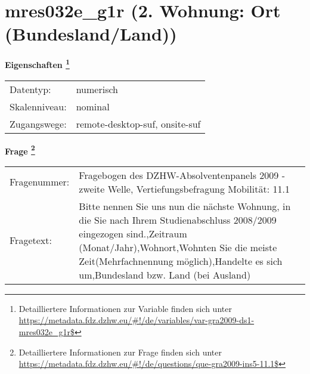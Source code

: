 
    \setcounter{footnote}{0}

    \vspace*{-1.8cm}
	\section{mres032e\_g1r (2. Wohnung: Ort (Bundesland/Land))}
	\label{section:mres032e_g1r}



    \vspace*{0.5cm}
    \noindent\textbf{Eigenschaften
	\footnote{Detailliertere Informationen zur Variable finden sich unter
		\url{https://metadata.fdz.dzhw.eu/\#!/de/variables/var-gra2009-ds1-mres032e_g1r$}}}\\
	\begin{tabularx}{\hsize}{@{}lX}
	Datentyp: & numerisch \\
	Skalenniveau: & nominal \\
	Zugangswege: &
	  remote-desktop-suf, 
	  onsite-suf
 \\
    \end{tabularx}



				\vspace*{0.5cm}
                \noindent\textbf{Frage
	                \footnote{Detailliertere Informationen zur Frage finden sich unter
		              \url{https://metadata.fdz.dzhw.eu/\#!/de/questions/que-gra2009-ins5-11.1$}}}\\
				\begin{tabularx}{\hsize}{@{}lX}
					Fragenummer: &
					  Fragebogen des DZHW-Absolventenpanels 2009 - zweite Welle, Vertiefungsbefragung Mobilität:
					  11.1
 \\
					Fragetext: & Bitte nennen Sie uns nun die nächste Wohnung, in die Sie nach Ihrem Studienabschluss 2008/2009 eingezogen sind.,Zeitraum (Monat/Jahr),Wohnort,Wohnten Sie die meiste Zeit(Mehrfachnennung möglich),Handelte es sich um,Bundesland bzw. Land (bei Ausland) \\
				\end{tabularx}





